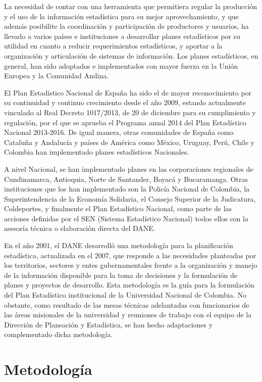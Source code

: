 \documentclass[
]{book}
\begin{document}
La necesidad de contar con una herramienta que permitiera regular la producción y el uso de la
información estadística para su mejor aprovechamiento, y que además posibilite la coordinación y
participación de productores y usuarios, ha llevado a varios países e instituciones a desarrollar
planes estadísticos por su utilidad en cuanto a reducir requerimientos estadísticos, y aportar a la
organización y articulación de sistemas de información. Los planes estadísticos, en general, han sido adoptados e implementados con
mayor fuerza en la Unión Europea y la Comunidad Andina.

El Plan Estadístico Nacional de España ha sido el de mayor reconocimiento por su continuidad y
continuo crecimiento desde el año 2009, estando actualmente vinculado al Real Decreto
1017/2013, de 20 de diciembre para su cumplimiento y regulación, por el que se aprueba el Programa anual 2014 del Plan Estadístico Nacional 2013-2016. De igual manera, otras comunidades
de España como Cataluña y Andalucía y países de América como México, Uruguay, Perú, Chile
y Colombia han implementado planes estadísticos Nacionales.

A nivel Nacional, se han implementado planes en las corporaciones regionales de Cundinamarca,
Antioquia, Norte de Santander, Boyacá y Bucaramanga. Otras instituciones que los han
implementado son la Policía Nacional de Colombia, la Superintendencia de la Economía Solidaria,
el Consejo Superior de la Judicatura, Coldeportes, y finalmente el Plan Estadístico Nacional, como
parte de las acciones definidas por el SEN (Sistema Estadístico Nacional) todos ellos con la asesoría
técnica o elaboración directa del DANE.

En el año 2001, el DANE desarrolló una metodología para la planificación estadística, actualizada
en el 2007, que responde a las necesidades planteadas por los territorios, sectores y entes
gubernamentales frente a la organización y manejo de la información disponible para la toma de
decisiones y la formulación de planes y proyectos de desarrollo. Esta metodología es la guía para la
formulación del Plan Estadístico institucional de la Universidad Nacional de Colombia. No obstante,
como resultado de las mesas técnicas adelantadas con funcionarios de las áreas misionales de la
universidad y reuniones de trabajo con el equipo de la Dirección de Planeación y Estadística, se
han hecho adaptaciones y complementado dicha metodología.

\hypertarget{metodologuxeda}{%
\chapter{Metodología}\label{metodologuxeda}}
\end{document}
